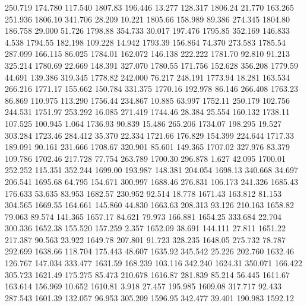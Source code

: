  250.719  174.780  117.540      1807.83
 196.446   13.277  128.317      1806.24
  21.770  163.265  251.936      1806.10
 341.706   28.209   10.221      1805.66
 158.989   89.386  274.345      1804.80
 186.758   29.000   51.726      1798.88
 354.733   30.017  197.476      1795.85
 352.169  146.833    4.538      1794.55
 182.198  109.228   14.942      1793.39
 156.864   74.370  273.583      1785.54
 287.099  166.115   86.025      1784.01
 162.072  146.138  222.222      1781.70
  92.810   91.213  325.214      1780.69
  22.669  148.391  327.070      1780.55
 171.756  152.628  356.208      1779.59
  44.691  139.386  319.345      1778.82
 242.000   76.217  248.191      1773.94
  18.281  163.534  266.216      1771.17
 155.662  150.784  331.375      1770.16
 192.978   86.146  266.408      1763.23
  86.869  110.975  113.290      1756.44
 234.867   10.885   63.997      1752.11
 250.179  102.756  244.531      1751.97
 253.292   16.085  271.419      1744.46
  28.384   25.554  160.132      1738.11
 107.525  100.945    1.064      1736.93
  90.839   15.486  265.206      1734.07
 198.295   19.527  303.284      1723.46
 284.412   35.370   22.334      1721.66
 176.829  154.399  224.644      1717.33
 189.091   90.161  231.666      1708.67
 320.901   85.601  149.365      1707.02
 327.976   83.379  109.786      1702.46
 217.728   77.754  263.789      1700.30
 296.878    1.627   42.095      1700.01
 252.252  115.351  352.244      1699.00
 193.987  148.381  204.054      1698.13
 340.668   34.697  206.541      1695.68
  64.795  154.671  300.997      1688.46
 276.831  106.173  241.326      1685.43
 176.633   53.635   83.953      1682.57
 230.952   92.514   18.778      1671.43
 163.812   81.153  304.565      1669.55
 164.661  145.860   44.830      1663.63
 208.313   93.126  210.163      1658.82
  79.063   89.574  141.365      1657.17
  84.621   79.973  166.881      1654.25
 333.684   22.704  300.336      1652.38
 155.520  157.259    2.357      1652.09
  38.691  144.111   27.811      1651.22
 217.387   90.563   23.922      1649.78
 207.801   91.723  328.235      1648.05
 275.732   78.787  292.699      1638.66
 118.704  175.443   48.607      1635.92
 345.542   25.226  202.760      1632.46
 126.767  147.034  333.477      1631.59
 168.239  103.116  342.240      1624.31
 350.071  166.422  305.723      1621.49
 175.275   85.473  210.678      1616.87
 281.839   85.214   56.445      1611.67
 163.614  156.969   10.652      1610.81
   3.918   27.457  195.985      1609.08
 317.717   92.433  287.543      1601.39
 132.057   96.953  305.209      1596.95
 342.477   39.401  190.983      1592.12
